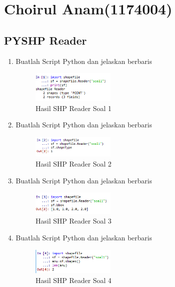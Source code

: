 \section{Choirul Anam(1174004)}
\subsection{PYSHP Reader}
\begin{enumerate}
    \item Buatlah Script Python dan jelaskan berbaris
    
    \hfill\break
    \begin{figure}[H]
		\includegraphics[width=4cm]{figures/1174004/3/1.png}
		\centering
		\caption{Hasil SHP Reader Soal 1}
    \end{figure}
    
    \item Buatlah Script Python dan jelaskan berbaris
    
    \hfill\break
    \begin{figure}[H]
		\includegraphics[width=4cm]{figures/1174004/3/2.png}
		\centering
		\caption{Hasil SHP Reader Soal 2}
    \end{figure}
    
    \item Buatlah Script Python dan jelaskan berbaris
    
    \hfill\break
    \begin{figure}[H]
		\includegraphics[width=4cm]{figures/1174004/3/3.png}
		\centering
		\caption{Hasil SHP Reader Soal 3}
    \end{figure}
    
    \item Buatlah Script Python dan jelaskan berbaris
    
    \hfill\break
    \begin{figure}[H]
		\includegraphics[width=4cm]{figures/1174004/3/4.png}
		\centering
		\caption{Hasil SHP Reader Soal 4}
    \end{figure}
    

\end{enumerate}
